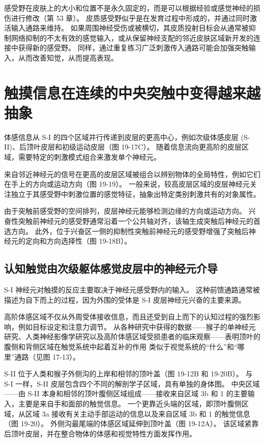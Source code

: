 感受野在皮肤上的大小和位置不是永久固定的，而是可以根据经验或感觉神经的损伤进行修改（第 53 章）。 皮质感受野似乎是在发育过程中形成的，并通过同时激活输入通路来维持。 如果周围神经受伤或被横切，其皮质投射目标会从通常被抑制网络抑制的不太有效的感觉输入，或从保留神经支配的邻近皮肤区域新开发的连接中获得新的感受野。 同样，通过重复练习广泛刺激传入通路可能会加强突触输入，从而改善知觉，从而提高表现。


\section{触摸信息在连续的中央突触中变得越来越抽象}
体感信息从 S-I 的四个区域并行传递到皮层的更高中心，例如次级体感皮层 (S-II)、后顶叶皮层和初级运动皮层（图 19-17C）。 随着信息流向更高阶的皮层区域，需要特定的刺激模式组合来激发单个神经元。

来自邻近神经元的信号在更高的皮层区域被组合以辨别物体的全局特性，例如它们在手上的方向或运动方向（图 19-19）。 一般来说，较高皮层区域的皮层神经元关注独立于其感受野中刺激位置的感觉特征，抽象出特定类别刺激共有的对象属性。

由于突触前感受野的空间排列，皮层神经元能够检测边缘的方向或运动方向。 兴奋性突触前神经元的感受野通常沿着一个公共轴对齐，该轴生成突触后神经元的首选方向。 此外，位于兴奋区一侧的抑制性突触前神经元的感受野增强了突触后神经元的定向和方向选择性（图 19-18B）。

\subsection{认知触觉由次级躯体感觉皮层中的神经元介导}
S-I 神经元对触摸的反应主要取决于神经元感受野内的输入。 这种前馈通路通常被描述为自下而上的过程，因为外围的受体是 S-I 皮层神经元兴奋的主要来源。

高阶体感区域不仅从外周受体接收信息，而且还受到自上而下的认知过程的强烈影响，例如目标设定和注意力调节。 从各种研究中获得的数据——猴子的单神经元研究、人类神经影像学研究以及高阶体感区域受损患者的临床观察——表明顶叶的腹侧和背侧区域在触觉系统中起着互补的作用 类似于视觉系统的“什么”和“哪里”通路（见图 17-13）。

S-II 位于人类和猴子外侧沟的上岸和相邻的顶叶盖（图 19-12B 和 19-20B）。 与 S-I 一样，S-II 皮层包含四个不同的解剖学子区域，具有单独的身体图。 中央区域——由 S-II 本身和相邻的顶叶腹侧区域组成——接收来自区域 3b 和 1 的主要输入，主要是来自手和面部的触觉信息。 一个更靠近头端的区域，即顶叶腹侧区域，从区域 3a 接收有关主动手部运动的信息以及来自区域 3b 和 1 的触觉信息（图 19-20）。 外侧沟最尾端的体感区域延伸到顶叶盖（图 19-12A）。 该区域紧靠后顶叶皮层，并在整合物体的体感和视觉特性方面发挥作用。

